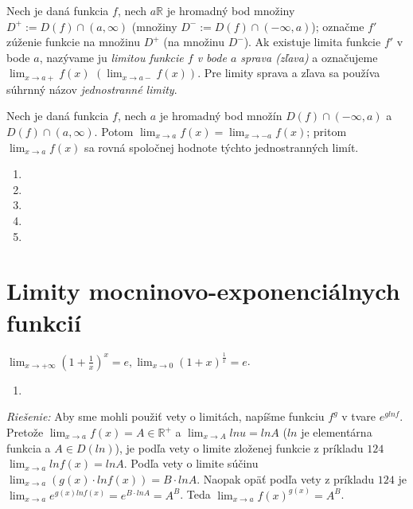 Nech je daná funkcia $f$, nech $a \mathbb{R}$ je hromadný bod množiny $D^+:=D(f)\cap (a,\infty)$ (množiny $D^-:=D(f)\cap (-\infty,a)$); označme $f'$ zúženie funkcie na množinu $D^+$ (na množinu $D^-$). Ak existuje limita funkcie $f'$ v bode $a$, nazývame ju \textit{limitou funkcie $f$ v bode $a$ sprava (zľava)} a označujeme $\lim_{x \rightarrow a+} f(x)$ $(\lim_{x \rightarrow a-} f(x))$. Pre limity sprava a zľava sa používa súhrnný názov \textit{jednostranné limity}.

\begin{veta}
Nech je daná funkcia $f$, nech $a$ je hromadný bod množín $D(f) \cap (-\infty,a)$ a $D(f) \cap (a,\infty)$. Potom $\lim_{x \rightarrow a} f(x)=\lim_{x \rightarrow -a} f(x)$; pritom $\lim_{x \rightarrow a} f(x)$ sa rovná spoločnej hodnote týchto jednostranných limít.
\end{veta}

\begin{enumerate}[resume]
  \item {}
  \item {}
  \item {}
  \item {}
  \item {}
\end{enumerate}

\section{Limity mocninovo-exponenciálnych funkcií}

\begin{veta}
$\lim_{x \rightarrow +\infty} (1+\frac{1}{x})^x=e,\lim_{x \rightarrow 0} (1+x)^{\frac{1}{x}}=e$.
\end{veta}

\begin{enumerate}[resume]
  \item {}
\end{enumerate}

\textit{Riešenie:}
Aby sme mohli použiť vety o limitách, napíšme funkciu $f^g$ v tvare $e^{g ln f}$. Pretože  $\lim_{x \rightarrow a} f(x)=A \in \mathbb{R^+}$ a $\lim_{x \rightarrow A} ln u= ln A$ ($ln$ je elementárna funkcia a $A \in D(ln)$), je podľa vety o limite zloženej funkcie z príkladu $124$ $\lim_{x \rightarrow a} ln f(x)=ln A$. Podľa vety o limite súčinu $\lim_{x \rightarrow a} (g(x)\cdot ln f(x))=B \cdot ln A$. Naopak opäť podľa vety z príkladu $124$ je $\lim_{x \rightarrow a} e^{g(x)ln f(x)}=e^{B \cdot ln A}=A^B$. Teda $\lim_{x \rightarrow a} f(x)^{g(x)}=A^B$.



